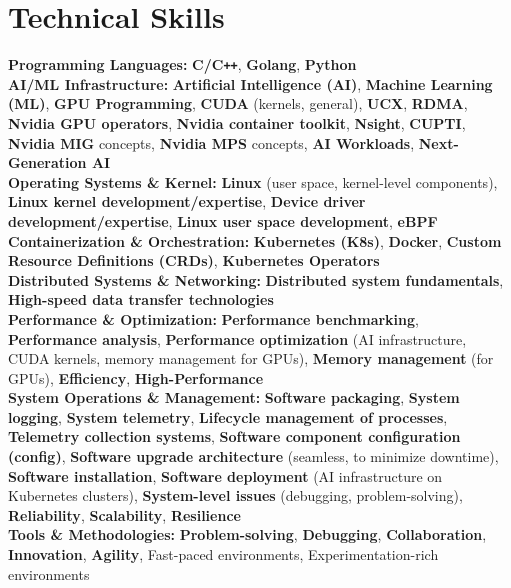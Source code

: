 \documentclass[11pt,a4paper]{article}
\begin{document}
\section*{Technical Skills}
\textbf{Programming Languages:} \textbf{C/C\texttt{++}}, \textbf{Golang}, \textbf{Python} \\
\textbf{AI/ML Infrastructure:} \textbf{Artificial Intelligence (AI)}, \textbf{Machine Learning (ML)}, \textbf{GPU Programming}, \textbf{CUDA} (kernels, general), \textbf{UCX}, \textbf{RDMA}, \textbf{Nvidia GPU operators}, \textbf{Nvidia container toolkit}, \textbf{Nsight}, \textbf{CUPTI}, \textbf{Nvidia MIG} concepts, \textbf{Nvidia MPS} concepts, \textbf{AI Workloads}, \textbf{Next-Generation AI} \\
\textbf{Operating Systems \& Kernel:} \textbf{Linux} (user space, kernel-level components), \textbf{Linux kernel development/expertise}, \textbf{Device driver development/expertise}, \textbf{Linux user space development}, \textbf{eBPF} \\
\textbf{Containerization \& Orchestration:} \textbf{Kubernetes (K8s)}, \textbf{Docker}, \textbf{Custom Resource Definitions (CRDs)}, \textbf{Kubernetes Operators} \\
\textbf{Distributed Systems \& Networking:} \textbf{Distributed system fundamentals}, \textbf{High-speed data transfer technologies} \\
\textbf{Performance \& Optimization:} \textbf{Performance benchmarking}, \textbf{Performance analysis}, \textbf{Performance optimization} (AI infrastructure, CUDA kernels, memory management for GPUs), \textbf{Memory management} (for GPUs), \textbf{Efficiency}, \textbf{High-Performance} \\
\textbf{System Operations \& Management:} \textbf{Software packaging}, \textbf{System logging}, \textbf{System telemetry}, \textbf{Lifecycle management of processes}, \textbf{Telemetry collection systems}, \textbf{Software component configuration (config)}, \textbf{Software upgrade architecture} (seamless, to minimize downtime), \textbf{Software installation}, \textbf{Software deployment} (AI infrastructure on Kubernetes clusters), \textbf{System-level issues} (debugging, problem-solving), \textbf{Reliability}, \textbf{Scalability}, \textbf{Resilience} \\
\textbf{Tools \& Methodologies:} \textbf{Problem-solving}, \textbf{Debugging}, \textbf{Collaboration}, \textbf{Innovation}, \textbf{Agility}, Fast-paced environments, Experimentation-rich environments
\end{document}
